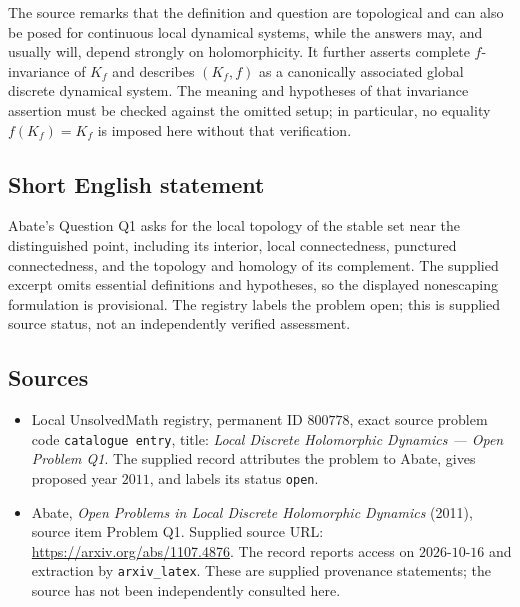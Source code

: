\documentclass[11pt]{article}
\begin{document}
The source remarks that the definition and question are topological and can also be posed for continuous local dynamical systems, while the answers may, and usually will, depend strongly on holomorphicity. It further asserts complete \(f\)-invariance of \(K_f\) and describes \((K_f,f)\) as a canonically associated global discrete dynamical system. The meaning and hypotheses of that invariance assertion must be checked against the omitted setup; in particular, no equality \(f(K_f)=K_f\) is imposed here without that verification.
\subsection{Short English statement}
Abate's Question Q1 asks for the local topology of the stable set near the distinguished point, including its interior, local connectedness, punctured connectedness, and the topology and homology of its complement. The supplied excerpt omits essential definitions and hypotheses, so the displayed nonescaping formulation is provisional. The registry labels the problem open; this is supplied source status, not an independently verified assessment.
\subsection{Sources}
\begin{itemize}
\item Local UnsolvedMath registry, permanent ID \(800778\), exact source problem code \texttt{catalogue entry}, title: \emph{Local Discrete Holomorphic Dynamics --- Open Problem Q1}. The supplied record attributes the problem to Abate, gives proposed year \(2011\), and labels its status \texttt{open}.
\item Abate, \emph{Open Problems in Local Discrete Holomorphic Dynamics} (2011), source item Problem Q1. Supplied source URL: \url{https://arxiv.org/abs/1107.4876}. The record reports access on \(2026\text{-}10\text{-}16\) and extraction by \texttt{arxiv\_latex}. These are supplied provenance statements; the source has not been independently consulted here.
\end{itemize}
\end{document}
